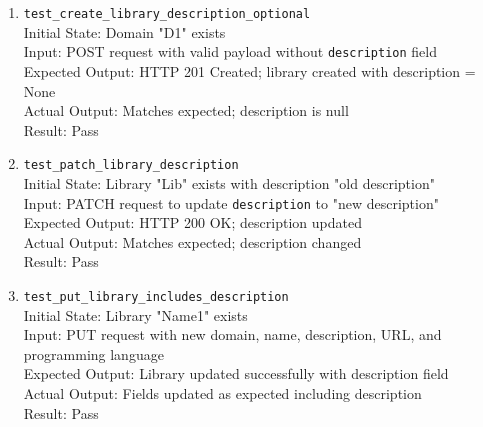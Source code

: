 \documentclass[12pt, titlepage]{article}
\begin{document}
\begin{enumerate}
    \item \texttt{test\_create\_library\_description\_optional} \label{test-create-library-description-optional}
      \\Initial State: Domain "D1" exists
      \\Input: POST request with valid payload without \texttt{description} field
      \\Expected Output: HTTP 201 Created; library created with description = None
      \\Actual Output: Matches expected; description is null
      \\Result: Pass

    \item \texttt{test\_patch\_library\_description} \label{test-patch-library-description}
      \\Initial State: Library "Lib" exists with description "old description"
      \\Input: PATCH request to update \texttt{description} to "new description"
      \\Expected Output: HTTP 200 OK; description updated
      \\Actual Output: Matches expected; description changed
      \\Result: Pass

    \item \texttt{test\_put\_library\_includes\_description} \label{test-put-library-includes-description}
      \\Initial State: Library "Name1" exists
      \\Input: PUT request with new domain, name, description, URL, and programming language
      \\Expected Output: Library updated successfully with description field
      \\Actual Output: Fields updated as expected including description
      \\Result: Pass
  \end{enumerate}
\end{document}
